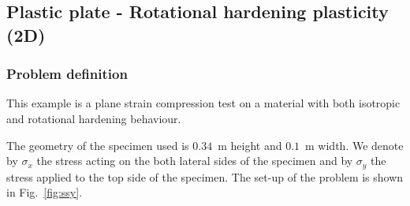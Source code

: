 \subsection{Plastic plate - Rotational hardening plasticity (2D)}

\subsubsection*{Problem definition}

This example is a plane strain compression test on a
material with both isotropic and rotational hardening behaviour.

The geometry of the specimen used is $0.34$~m height and $0.1$~m
width. We denote by $\sigma_x$ the stress acting on the both
lateral sides of the specimen and by $\sigma_y$ the stress applied
to the top side of the specimen.
 The set-up of the problem is shown in Fig.~\ref{fig:ssy}.

